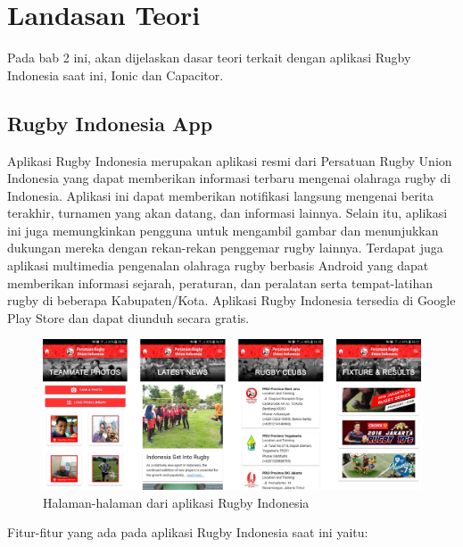 \chapter{Landasan Teori}
\label{chap:teori}

Pada bab 2 ini, akan dijelaskan dasar teori terkait dengan aplikasi Rugby Indonesia saat ini, Ionic dan Capacitor. 

\section{Rugby Indonesia App}
\label{sec:skripsi} 
    Aplikasi Rugby Indonesia merupakan aplikasi resmi dari Persatuan Rugby Union Indonesia yang dapat memberikan informasi terbaru mengenai olahraga rugby di Indonesia. Aplikasi ini dapat memberikan notifikasi langsung mengenai berita terakhir, turnamen yang akan datang, dan informasi lainnya. Selain itu, aplikasi ini juga memungkinkan pengguna untuk mengambil gambar dan menunjukkan dukungan mereka dengan rekan-rekan penggemar rugby lainnya. Terdapat juga aplikasi multimedia pengenalan olahraga rugby berbasis Android yang dapat memberikan informasi sejarah, peraturan, dan peralatan serta tempat-latihan rugby di beberapa Kabupaten/Kota. Aplikasi Rugby Indonesia tersedia di Google Play Store dan dapat diunduh secara gratis.

    \begin{figure} [!h]
        \centering
        \includegraphics[scale=0.725]{Gambar/Rugby-Indonesia-App-UI.png}
        \caption[Halaman aplikasi Rugby Indonesia]{Halaman-halaman dari aplikasi Rugby Indonesia}
        \label{fig:halaman-rugby-indonesia}
    \end{figure}

    Fitur-fitur yang ada pada aplikasi Rugby Indonesia saat ini yaitu:

